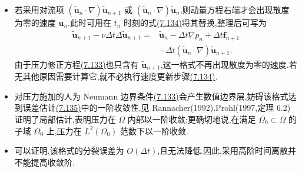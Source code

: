 \begin{note}[关于非增量压力修正格式]\label{note:nonincremental-pressure-correction-properties}
\begin{itemize}
   \item 若采用对流项 $(\widetilde{\bm{u}}_n\cdot\nabla)\widetilde{\bm{u}}_{n+1}$ 或 $(\widetilde{\bm{u}}_n\cdot\nabla)\widetilde{\bm{u}}_n$,则动量方程右端才会出现散度为零的速度 $\bm{u}_n$.此时可用在 $t_n$ 时刻的式\hyperref[eq:nonincremental-velocity-recovery]{(7.134)}将其替换,整理后可写为
\[
\begin{aligned}
 \widetilde{\bm{u}}_{n+1}
 -\nu\Delta t\Delta\widetilde{\bm{u}}_{n+1}
 ={}&\widetilde{\bm{u}}_n-\Delta t\nabla p_n
   +\Delta t\bm{f}_{n+1}\\
 &-\Delta t(\widetilde{\bm{u}}_n\cdot\nabla)
   \widetilde{\bm{u}}_{n+1}.
\end{aligned}
\]
由于压力修正方程\hyperref[eq:nonincremental-pressure-poisson]{(7.133)}也只含有
$\widetilde{\bm{u}}_{n+1}$,这一格式不再出现散度为零的速度.若无其他原因需要计算它,就不必执行速度更新步骤\hyperref[eq:nonincremental-velocity-recovery]{(7.134)}.
  \item 对压力施加的人为 Neumann 边界条件\hyperref[eq:nonincremental-pressure-neumann]{(7.133)}会产生数值边界层,妨碍该格式达到误差估计\hyperref[eq:nonincremental-pressure-correction-errors]{(7.135)}中的一阶收敛性,见 Rannacher(1992).Prohl(1997,定理 6.2)证明了局部估计,表明压力在 $\Omega$ 内部以一阶收敛;更确切地说,在满足 $\overline{\Omega_0}\subset\Omega$ 的子域 $\Omega_0$ 上,压力在 $L^2(\Omega_0)$ 范数下以一阶收敛.
  \item 可以证明,该格式的分裂误差为 $O(\Delta t)$,且无法降低.因此,采用高阶时间离散并不能提高收敛阶.
\end{itemize}
\end{note}


